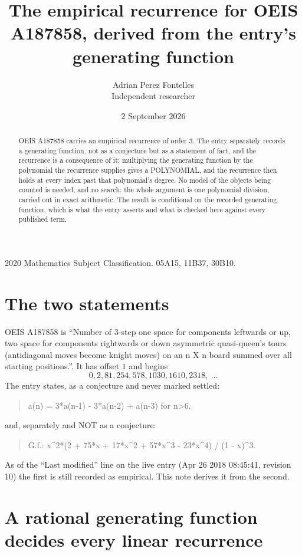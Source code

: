 \documentclass[11pt,a4paper]{article}
\title{The empirical recurrence for OEIS A187858, derived from the entry's generating function}
\author{Adrian Perez Fontelles\\ \small Independent researcher}
\date{2 September 2026}
\theoremstyle{plain}
\theoremstyle{definition}
\begin{document}
\maketitle

\begin{abstract}
OEIS A187858 carries an empirical recurrence of order $3$. The entry separately records a
generating function, not as a conjecture but as a statement of fact, and the recurrence is a
consequence of it: multiplying the generating function by the polynomial the recurrence
supplies gives a POLYNOMIAL, and the recurrence then holds at every index past that
polynomial's degree. No model of the objects being counted is needed, and no search: the
whole argument is one polynomial division, carried out in exact arithmetic. The result is
conditional on the recorded generating function, which is what the entry asserts and what is
checked here against every published term.
\end{abstract}

\noindent\small 2020 Mathematics Subject Classification. 05A15, 11B37, 30B10.\normalsize

\section{The two statements}

OEIS A187858 is ``Number of 3-step one space for components leftwards or up, two space for components rightwards or down asymmetric quasi-queen's tours (antidiagonal moves become knight moves) on an n X n board summed over all starting positions.''. It has offset $1$ and begins
\[
0, 2, 81, 254, 578, 1030, 1610, 2318,\ \dots
\]
The entry states, as a conjecture and never marked settled:
\begin{quote}
a(n) = 3*a(n-1) - 3*a(n-2) + a(n-3) for n>6.
\end{quote}
and, separately and NOT as a conjecture:
\begin{quote}
G.f.: x\^{}2*(2 + 75*x + 17*x\^{}2 + 57*x\^{}3 - 23*x\^{}4) / (1 - x)\^{}3.
\end{quote}
As of the ``Last modified'' line on the live entry (Apr 26 2018 08:45:41, revision 10) the first is still
recorded as empirical. This note derives it from the second.

\section{A rational generating function decides every linear recurrence}
\end{document}
